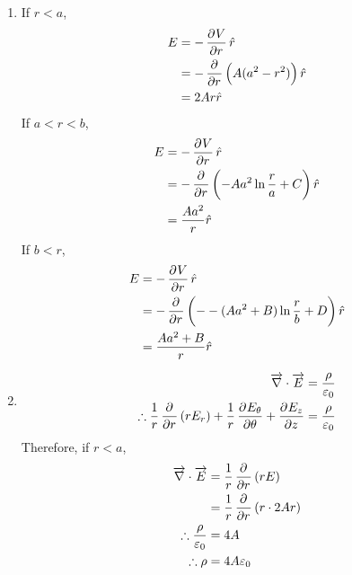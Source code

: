 \documentclass[fleqn, a4paper, 12pt, twoside]{article}
\theoremstyle{definition}
\theoremstyle{theorem}
\begin{document}
\begin{solution}
	\begin{enumerate}[leftmargin = *]
		\item
			If $r < a$,
			\begin{align*}
				E & = -\dpd{V}{r} \hat{r}                             \\
                                  & = -\dpd{}{r} \left( A (a^2 - r^2) \right) \hat{r} \\
                                  & = 2 A r \hat{r}
			\end{align*}
			If $a < r < b$,
			\begin{align*}
				E & = -\dpd{V}{r} \hat{r}                                          \\
                                  & = -\dpd{}{r} \left( -A a^2 \ln \frac{r}{a} + C \right) \hat{r} \\
                                  & = \frac{A a^2}{r} \hat{r}
			\end{align*}
			If $b < r$,
			\begin{align*}
				E & = -\dpd{V}{r} \hat{r}                                                 \\
                                  & = -\dpd{}{r} \left( --(A a^2 + B) \ln \frac{r}{b} + D \right) \hat{r} \\
                                  & = \frac{A a^2 + B}{r} \hat{r}
			\end{align*}
		\item
			\begin{align*}
				\overrightarrow{\nabla} \cdot \overrightarrow{E}                                               & = \frac{\rho}{\varepsilon_0} \\
				\therefore \frac{1}{r} \dpd{}{r} (r E_r) + \frac{1}{r} \dpd{E_{\theta}}{\theta} + \dpd{E_z}{z} & = \frac{\rho}{\varepsilon_0}
			\end{align*}
			Therefore, if $r < a$,
			\begin{align*}
				\overrightarrow{\nabla} \cdot \overrightarrow{E} & = \frac{1}{r} \dpd{}{r} \left( r E \right)           \\
                                                                                 & = \frac{1}{r} \dpd{}{r} \left( r \cdot 2 A r \right) \\
				\therefore \frac{\rho}{\varepsilon_0}            & = 4 A                                                \\
				\therefore \rho                                  & = 4 A \varepsilon_0

\end{align*}
\end{enumerate}
\end{solution}
\end{document}
